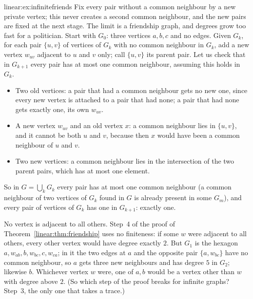 \begin{solution}{linear:ex:infinitefriends}
\idea Fix every pair without a common neighbour by a new private vertex; this never creates a second common neighbour, and the new
pairs are fixed at the next stage. The limit is a friendship graph, and degrees grow too fast for a politician.
\writeup Start with $G_0$: three vertices $a,b,c$ and no edges. Given $G_k$, for each pair $\{u,v\}$ of vertices of $G_k$ with no
common neighbour in $G_k$, add a new vertex $w_{uv}$ adjacent to $u$ and $v$ only; call $\{u,v\}$ its parent pair. Let us check
that in $G_{k+1}$ every pair has at most one common neighbour, assuming this holds in $G_k$.
\begin{itemize}
\item Two old vertices: a pair that had a common neighbour gets no new one, since every new vertex is attached to a pair that had
none; a pair that had none gets exactly one, its own $w_{uv}$.
\item A new vertex $w_{uv}$ and an old vertex $x$: a common neighbour lies in $\{u,v\}$, and it cannot be both $u$ and $v$, because
then $x$ would have been a common neighbour of $u$ and $v$.
\item Two new vertices: a common neighbour lies in the intersection of the two parent pairs, which has at most one element.
\end{itemize}
So in $G=\bigcup_kG_k$ every pair has at most one common neighbour (a common neighbour of two vertices of $G_k$ found in $G$ is
already present in some $G_m$), and every pair of vertices of $G_k$ has one in $G_{k+1}$: exactly one.

No vertex is adjacent to all others. Step~4 of the proof of Theorem~\ref{linear:thm:friendship} uses no finiteness: if some $w$ were
adjacent to all others, every other vertex would have degree exactly $2$. But $G_1$ is the hexagon $a,w_{ab},b,w_{bc},c,w_{ca}$; in
it the two edges at $a$ and the opposite pair $\{a,w_{bc}\}$ have no common neighbour, so $a$ gets three new neighbours and has
degree $5$ in $G_2$; likewise $b$. Whichever vertex $w$ were, one of $a,b$ would be a vertex other than $w$ with
degree above $2$. (So which step of the proof breaks for infinite graphs? Step~3, the only one that takes a trace.)
\end{solution}

